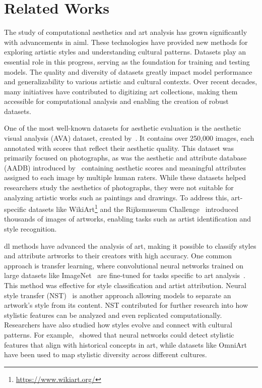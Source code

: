 \section{Related Works}
The study of computational aesthetics and art analysis has grown significantly with advancements in \gls{ai}\gls{ml}. These technologies have provided new methods for exploring artistic styles and understanding cultural patterns. Datasets play an essential role in this progress, serving as the foundation for training and testing models. The quality and diversity of datasets greatly impact model performance and generalizability to various artistic and cultural contexts. Over recent decades, many initiatives have contributed to digitizing art collections, making them accessible for computational analysis and enabling the creation of robust datasets.

One of the most well-known datasets for aesthetic evaluation is the aesthetic visual analysis (AVA) dataset, created by~\cite{murray2012ava}. It contains over 250,000 images, each annotated with scores that reflect their aesthetic quality. This dataset was primarily focused on photographs, as was the aesthetic and attribute database (AADB) introduced by~\cite{kong2016photo} containing aesthetic scores and meaningful attributes assigned to each image by multiple human raters.
 While these datasets helped researchers study the aesthetics of photographs, they were not suitable for analyzing artistic works such as paintings and drawings. To address this, art-specific datasets like WikiArt\footnote{\url{https://www.wikiart.org/}} and the Rijksmuseum Challenge~\cite{mensink14icmr} introduced thousands of images of artworks, enabling tasks such as artist identification and style recognition. %

\gls{dl} methods have advanced the analysis of art, making it possible to classify styles \cite{SCARINGI2025112857} and attribute artworks to their creators with high accuracy. One common approach is transfer learning, where convolutional neural networks trained on large datasets like ImageNet~\cite{deng2009imagenet} are fine-tuned for tasks specific to art analysis~\cite{cetinic2022understanding}. This method was effective for style classification and artist attribution. Neural style transfer (NST)~\cite{jing2019neural,gatys2015neural} is another approach allowing models to separate an artwork's style from its content. NST contributed for further research into how stylistic features can be analyzed and even replicated computationally. Researchers have also studied how styles evolve and connect with cultural patterns. For example,~\cite{cetinic2022understanding} showed that neural networks could detect stylistic features that align with historical concepts in art, while datasets like OmniArt~\cite{strezoski2018omniart} have been used to map stylistic diversity across different cultures. 

